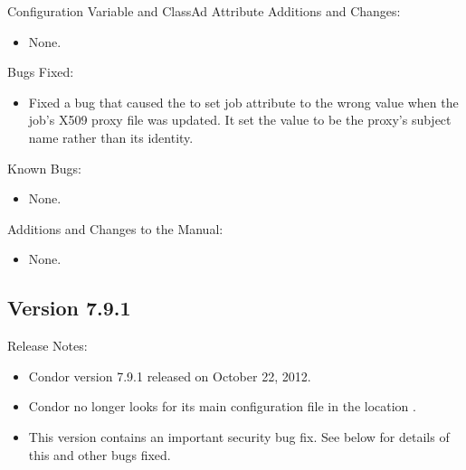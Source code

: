 \noindent Configuration Variable and ClassAd Attribute Additions and Changes:

\begin{itemize}

\item None.

\end{itemize}

\noindent Bugs Fixed:

\begin{itemize}

\item Fixed a bug that caused the  to set job attribute
 to the wrong value when the job's X509
proxy file was updated. It set the value to be the proxy's subject name
rather than its identity.

\end{itemize}

\noindent Known Bugs:

\begin{itemize}

\item None.

\end{itemize}

\noindent Additions and Changes to the Manual:

\begin{itemize}

\item None.

\end{itemize}


\subsection*{\label{sec:New-7-9-1}Version 7.9.1}

\noindent Release Notes:

\begin{itemize}

\item Condor version 7.9.1 released on October 22, 2012.

\item Condor no longer looks for its main configuration file in the
location .

\item \Security This version contains an important security bug fix.  See below
for details of this and other bugs fixed.

\end{itemize}


